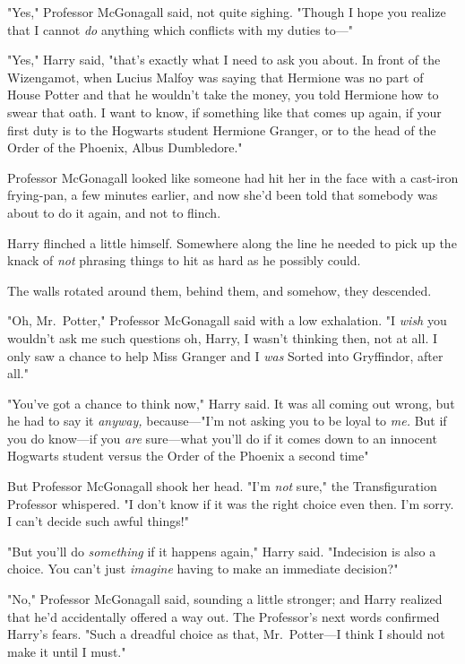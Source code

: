 "Yes," Professor McGonagall said, not quite sighing. "Though I hope you realize
that I cannot \emph{do} anything which conflicts with my duties to—"

"Yes," Harry said, "that's exactly what I need to ask you about. In front of
the Wizengamot, when Lucius Malfoy was saying that Hermione was no part of
House Potter and that he wouldn't take the money, you told Hermione how to
swear that oath. I want to know, if something like that comes up again, if your
first duty is to the Hogwarts student Hermione Granger, or to the head of the
Order of the Phoenix, Albus Dumbledore."

Professor McGonagall looked like someone had hit her in the face with a
cast-iron frying-pan, a few minutes earlier, and now she'd been told that
somebody was about to do it again, and not to flinch.

Harry flinched a little himself. Somewhere along the line he needed to pick up
the knack of \emph{not} phrasing things to hit as hard as he possibly could.

The walls rotated around them, behind them, and somehow, they descended.

"Oh, Mr.~Potter," Professor McGonagall said with a low exhalation. "I{\el}
\emph{wish} you wouldn't ask me such questions{\el} oh, Harry, I wasn't
thinking then, not at all. I only saw a chance to help Miss Granger and{\el}
I \emph{was} Sorted into Gryffindor, after all."

"You've got a chance to think now," Harry said. It was all coming out wrong,
but he had to say it \emph{anyway,} because—"I'm not asking you to be loyal
to \emph{me.} But if you do know—if you \emph{are} sure—what you'll do if
it comes down to an innocent Hogwarts student versus the Order of the Phoenix a
second time{\el}"

But Professor McGonagall shook her head. "I'm \emph{not} sure," the
Transfiguration Professor whispered. "I don't know if it was the right choice
even then. I'm sorry. I can't decide such awful things!"

"But you'll do \emph{something} if it happens again," Harry said. "Indecision
is also a choice. You can't just \emph{imagine} having to make an immediate
decision?"

"No," Professor McGonagall said, sounding a little stronger; and Harry realized
that he'd accidentally offered a way out. The Professor's next words confirmed
Harry's fears. "Such a dreadful choice as that, Mr.~Potter—I think I should
not make it until I must."

